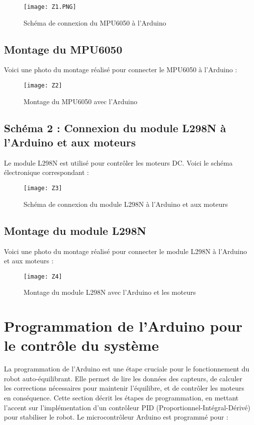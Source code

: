 \documentclass{report}
\begin{document}
\begin{figure}[h!]
\centering
\texttt{[image: Z1.PNG]}
\caption{Schéma de connexion du MPU6050 à l'Arduino}
\label{fig:mpu6050_schema}
\end{figure}

\subsection{Montage du MPU6050}
Voici une photo du montage réalisé pour connecter le MPU6050 à l'Arduino :

\begin{figure}[h!]
\centering
\texttt{[image: Z2]}
\caption{Montage du MPU6050 avec l'Arduino}
\label{fig:mpu6050_montage}
\end{figure}
\vspace{6cm}
\subsection{Schéma 2 : Connexion du module L298N à l'Arduino et aux moteurs}
Le module L298N est utilisé pour contrôler les moteurs DC. Voici le schéma électronique correspondant :

\begin{figure}[h!]
\centering
\texttt{[image: Z3]}
\caption{Schéma de connexion du module L298N à l'Arduino et aux moteurs}
\label{fig:l298n_schema}
\end{figure}

\subsection{Montage du module L298N}
Voici une photo du montage réalisé pour connecter le module L298N à l'Arduino et aux moteurs :

\begin{figure}[h!]
\centering
\texttt{[image: Z4]}
\caption{Montage du module L298N avec l'Arduino et les moteurs}
\label{fig:l298n_montage}
\end{figure}
\vspace{6cm}
\section{Programmation de l'Arduino pour le contrôle du système}
La programmation de l'Arduino est une étape cruciale pour le fonctionnement du robot auto-équilibrant. Elle permet de lire les données des capteurs, de calculer les corrections nécessaires pour maintenir l'équilibre, et de contrôler les moteurs en conséquence. Cette section décrit les étapes de programmation, en mettant l'accent sur l'implémentation d'un contrôleur PID (Proportionnel-Intégral-Dérivé) pour stabiliser le robot.
Le microcontrôleur Arduino est programmé pour :
\end{document}
